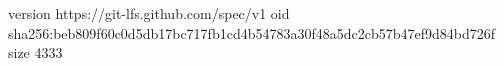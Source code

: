 version https://git-lfs.github.com/spec/v1
oid sha256:beb809f60c0d5db17bc717fb1cd4b54783a30f48a5dc2cb57b47ef9d84bd726f
size 4333
